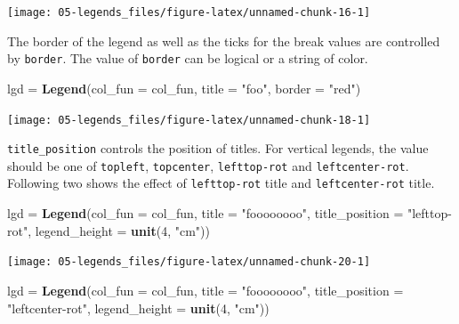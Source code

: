 \documentclass[]{book}
\newenvironment{Shaded}{\begin{snugshade}}{\end{snugshade}}
\newcommand{\KeywordTok}[1]{\textcolor[rgb]{0.13,0.29,0.53}{\textbf{#1}}}
\newcommand{\DataTypeTok}[1]{\textcolor[rgb]{0.13,0.29,0.53}{#1}}
\newcommand{\DecValTok}[1]{\textcolor[rgb]{0.00,0.00,0.81}{#1}}
\newcommand{\StringTok}[1]{\textcolor[rgb]{0.31,0.60,0.02}{#1}}
\newcommand{\NormalTok}[1]{#1}
\theoremstyle{definition}
\theoremstyle{definition}
\theoremstyle{definition}
\theoremstyle{remark}
\begin{document}
\begin{center}\texttt{[image: 05-legends\_files/figure-latex/unnamed-chunk-16-1]} \end{center}

The border of the legend as well as the ticks for the break values are
controlled by \texttt{border}. The value of \texttt{border} can be
logical or a string of color.

\begin{Shaded}
\begin{Highlighting}[]
\NormalTok{lgd =}\StringTok{ }\KeywordTok{Legend}\NormalTok{(}\DataTypeTok{col_fun =}\NormalTok{ col_fun, }\DataTypeTok{title =} \StringTok{"foo"}\NormalTok{, }\DataTypeTok{border =} \StringTok{"red"}\NormalTok{)}
\end{Highlighting}
\end{Shaded}

\begin{center}\texttt{[image: 05-legends\_files/figure-latex/unnamed-chunk-18-1]} \end{center}

\texttt{title\_position} controls the position of titles. For vertical
legends, the value should be one of \texttt{topleft},
\texttt{topcenter}, \texttt{lefttop-rot} and \texttt{leftcenter-rot}.
Following two shows the effect of \texttt{lefttop-rot} title and
\texttt{leftcenter-rot} title.

\begin{Shaded}
\begin{Highlighting}[]
\NormalTok{lgd =}\StringTok{ }\KeywordTok{Legend}\NormalTok{(}\DataTypeTok{col_fun =}\NormalTok{ col_fun, }\DataTypeTok{title =} \StringTok{"foooooooo"}\NormalTok{, }\DataTypeTok{title_position =} \StringTok{"lefttop-rot"}\NormalTok{,}
    \DataTypeTok{legend_height =} \KeywordTok{unit}\NormalTok{(}\DecValTok{4}\NormalTok{, }\StringTok{"cm"}\NormalTok{))}
\end{Highlighting}
\end{Shaded}

\begin{center}\texttt{[image: 05-legends\_files/figure-latex/unnamed-chunk-20-1]} \end{center}

\begin{Shaded}
\begin{Highlighting}[]
\NormalTok{lgd =}\StringTok{ }\KeywordTok{Legend}\NormalTok{(}\DataTypeTok{col_fun =}\NormalTok{ col_fun, }\DataTypeTok{title =} \StringTok{"foooooooo"}\NormalTok{, }\DataTypeTok{title_position =} \StringTok{"leftcenter-rot"}\NormalTok{,}
    \DataTypeTok{legend_height =} \KeywordTok{unit}\NormalTok{(}\DecValTok{4}\NormalTok{, }\StringTok{"cm"}\NormalTok{))}
\end{Highlighting}
\end{Shaded}
\end{document}
